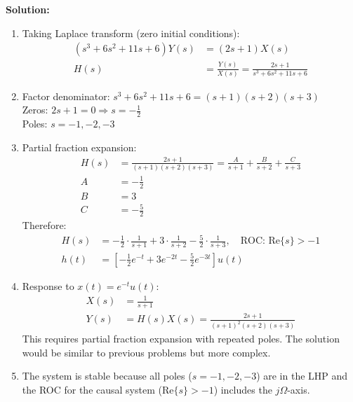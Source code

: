 \documentclass{article}
\begin{document}
\textbf{Solution:}
\begin{enumerate}[label=(\alph*)]
    \item Taking Laplace transform (zero initial conditions):
    \begin{align*}
        (s^3 + 6s^2 + 11s + 6)Y(s) &= (2s + 1)X(s) \\
        H(s) &= \frac{Y(s)}{X(s)} = \frac{2s + 1}{s^3 + 6s^2 + 11s + 6}
    \end{align*}
    
    \item Factor denominator: $s^3 + 6s^2 + 11s + 6 = (s + 1)(s + 2)(s + 3)$ \\
    Zeros: $2s + 1 = 0 \Rightarrow s = -\frac{1}{2}$ \\
    Poles: $s = -1, -2, -3$
    
    \item Partial fraction expansion:
    \begin{align*}
        H(s) &= \frac{2s + 1}{(s + 1)(s + 2)(s + 3)} = \frac{A}{s + 1} + \frac{B}{s + 2} + \frac{C}{s + 3} \\
        A & = -\frac{1}{2} \\
        B &  = 3 \\
        C &= -\frac{5}{2}
    \end{align*}
    Therefore:
    \begin{align*}
        H(s) &= -\frac{1}{2} \cdot \frac{1}{s + 1} + 3 \cdot \frac{1}{s + 2} - \frac{5}{2} \cdot \frac{1}{s + 3}, \quad \text{ROC: } \text{Re}\{s\} > -1 \\
        h(t) &= \left[-\frac{1}{2}e^{-t} + 3e^{-2t} - \frac{5}{2}e^{-3t}\right]u(t)
    \end{align*}
    
    \item Response to $x(t) = e^{-t}u(t)$:
    \begin{align*}
        X(s) &= \frac{1}{s + 1} \\
        Y(s) &= H(s)X(s) = \frac{2s + 1}{(s + 1)^2(s + 2)(s + 3)}
    \end{align*}
    This requires partial fraction expansion with repeated poles. The solution would be similar to previous problems but more complex.
    
    \item The system is stable because all poles ($s = -1, -2, -3$) are in the LHP and the ROC for the causal system ($\text{Re}\{s\} > -1$) includes the $j\Omega$-axis.
\end{enumerate}
\end{document}
